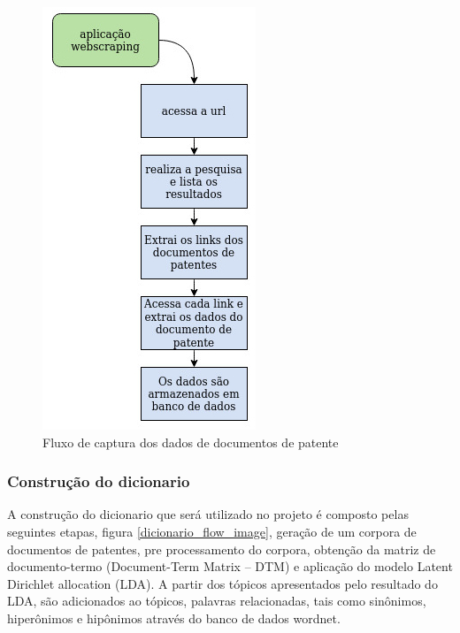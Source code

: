 \begin{figure}[ht!]
	\centering
	\includegraphics[scale=0.5]{imagens/tcc_webscraping.jpg}
	\caption{Fluxo de captura dos dados de documentos de patente 
			 \label{webscraping_flow_image}}
\end{figure}


\subsubsection{Construção do dicionario}
A construção do dicionario que será utilizado no projeto é composto pelas seguintes etapas, figura \ref{dicionario_flow_image}, geração de um corpora de documentos de patentes, pre processamento do corpora, obtenção da matriz de documento-termo (Document-Term Matrix – DTM) e aplicação do modelo Latent Dirichlet allocation (LDA). A partir dos tópicos apresentados pelo resultado do LDA, são adicionados ao tópicos, palavras relacionadas, tais como sinônimos, hiperônimos e hipônimos através do banco de dados wordnet.

